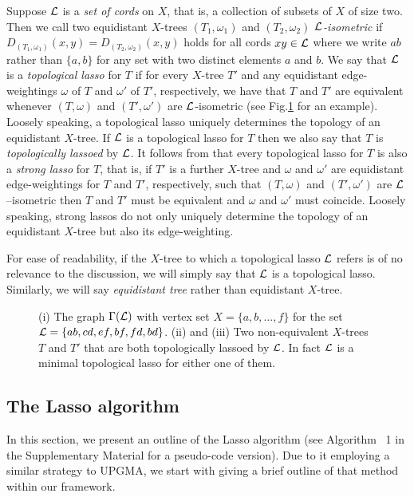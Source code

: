 Suppose ${\mathcal L}$ is a {\em set of cords} on $X$, that is, a collection of subsets
of $X$ of size two. Then we call two equidistant $X$-trees $(T_1,\omega_1)$
and $(T_2,\omega_2)$ {\em ${\mathcal L}$-isometric} if
$D_{(T_1,\omega_1)}(x,y)=D_{(T_2,\omega_2)}(x,y)$ holds for all cords $xy\in
{\mathcal L}$ where we write $ab$ rather than $\{a,b\}$ for any set with two distinct
elements $a$ and $b$.  We say that ${\mathcal L}$ is a {\em topological lasso} for $T$
if for every $X$-tree $T'$ and any equidistant edge-weightings $\omega$ of $T$
and $\omega'$ of $T'$, respectively, we have that $T$ and $T'$ are equivalent
whenever $(T,\omega)$ and $(T',\omega')$ are ${\mathcal L}$-isometric (see
Fig.\ref{fig:block-graph-motivation} for an example).  Loosely speaking, a
topological lasso uniquely determines the topology of an equidistant
$X$-tree. If ${\mathcal L}$ is a topological lasso for $T$ then we also say that $T$ is
{\em topologically lassoed} by ${\mathcal L}$.  It follows from \cite{huber13lassoing}
that every topological lasso for $T$ is also a {\em strong lasso} for $T$,
that is, if $T'$ is a further $X$-tree and $\omega$ and $\omega'$ are
equidistant edge-weightings for $T$ and $T'$, respectively, such that
$(T,\omega)$ and $(T',\omega')$ are ${\mathcal L}$--isometric then $T$ and $T'$ must be
equivalent and $\omega$ and $\omega'$ must coincide. Loosely speaking, strong
lassos do not only uniquely determine the topology of an equidistant $X$-tree
but also its edge-weighting.
 
For ease of readability, if the $X$-tree to which a topological lasso ${\mathcal L}$
refers is of no relevance to the discussion, we will simply say that ${\mathcal L}$ is
a topological lasso.  Similarly, we will say {\em equidistant tree} rather
than equidistant $X$-tree.


\begin{figure}
  \caption{(i) The graph $\Gamma({\mathcal L})$ with vertex set $X=\{a,b,\ldots,f\}$
    for the set ${\mathcal L}=\{ab,cd,ef,bf,fd,bd\}$. (ii) and (iii) Two non-equivalent
    $X$-trees $T$ and $T'$ that are both topologically lassoed by ${\mathcal L}$. In
    fact ${\mathcal L}$ is a minimal topological lasso for either one of them.  }
  \label{fig:block-graph-motivation}
\end{figure}

\subsection{The {\sc Lasso} algorithm}
\label{sec:sc-lasso-algorithm}

In this section, we present an outline of the {\sc Lasso} algorithm (see
Algorithm ~1 in the Supplementary Material for a pseudo-code version). Due to
it employing a similar strategy to \textsc{UPGMA}, we start with giving a
brief outline of that method within our framework.

